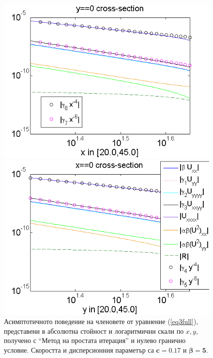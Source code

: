 \documentclass{article}
\newcommand{\rf}[1]{(\ref{#1})}
\theoremstyle{remark}
\begin{document}
\FloatBarrier
\begin{figure}[ht]
	\begin{minipage}[b]{0.95\linewidth}
		\raggedleft
		\includegraphics[width=\linewidth]{AssymptForEachTerm/c017_bt1_5/ChristovIC_AlongX_50_ZB2_bt5_c017_h020_O(h^6).png}
	\end{minipage}
	\begin{minipage}[b]{0.95\linewidth}
		 \raggedright
		\includegraphics[width=\linewidth]{AssymptForEachTerm/c017_bt1_5/ChristovIC_AlongY_50_ZB2_bt5_c017_h020_O(h^6).png}
	\end{minipage}
	\caption{Асимптотичното поведение на членовете от уравнение \rf{eq3full}, представени в абсолютна стойност и логаритмични скали по $x,y$, получено с ``Метод на простата итерация'' и нулево гранично условие. Скоростта и дисперсионния параметър са $\boldsymbol{c=0.17}$ и $\boldsymbol{\beta = 5}$.}
	\label{fig:assympt_c017bt5}
\end{figure}
\end{document}
